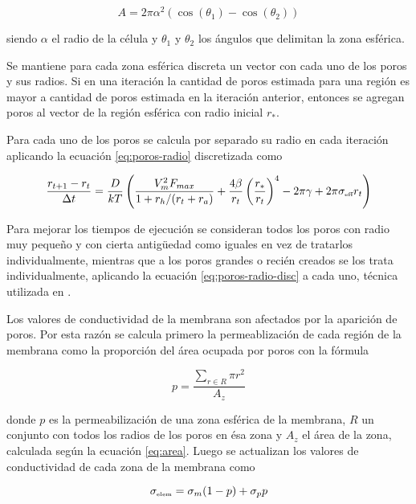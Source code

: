 \begin{equation} \label{eq:area}
	A = 2 \pi \alpha^2 (\cos(\theta_1) - \cos(\theta_2))
\end{equation}

siendo $\alpha$ el radio de la célula y $\theta_1$ y $\theta_2$ los ángulos que delimitan la zona esférica.

Se mantiene para cada zona esférica discreta un vector con cada uno de los poros y sus radios. Si en una iteración la cantidad de poros estimada para una región es mayor a cantidad de poros estimada en la iteración anterior, entonces se agregan poros al vector de la región esférica con radio inicial $r_*$.

Para cada uno de los poros se calcula por separado su radio en cada iteración aplicando la ecuación \ref{eq:poros-radio} discretizada como

\begin{equation} \label{eq:poros-radio-disc}
	\frac{r_{t+1} - r_t}{\Delta t} = \frac{D}{kT} \left( \frac{V_m^2 F_{max}}{1+r_h / (r_t+r_a)} + \frac{4 \beta}{r_t} \left(\frac{r_*}{r_t}\right)^4 - 2 \pi \gamma + 2 \pi \sigma_{\textrm{\tiny eff}} r_t \right)
\end{equation}

Para mejorar los tiempos de ejecución se consideran todos los poros con radio muy pequeño y con cierta antigüedad como iguales en vez de tratarlos individualmente, mientras que a los poros grandes o recién creados se los trata individualmente, aplicando la ecuación \ref{eq:poros-radio-disc} a cada uno, técnica utilizada en \cite{krass}.

Los valores de conductividad de la membrana son afectados por la aparición de poros. Por esta razón se calcula primero la permeablización de cada región de la membrana como la proporción del área ocupada por poros con la fórmula

\begin{equation} 
    p = \frac{ \sum\limits_{r \in R} \pi r^2 }{A_z}
\end{equation} 

donde $p$ es la permeabilización de una zona esférica de la membrana, $R$ un conjunto con todos los radios de los poros en ésa zona y $A_z$ el área de la zona, calculada según la ecuación \ref{eq:area}. Luego se actualizan los valores de conductividad de cada zona de la membrana como

\begin{equation} 
	\sigma_{\textrm{\tiny elem}} = \sigma_m (1 - p) + \sigma_p p
\end{equation} 

